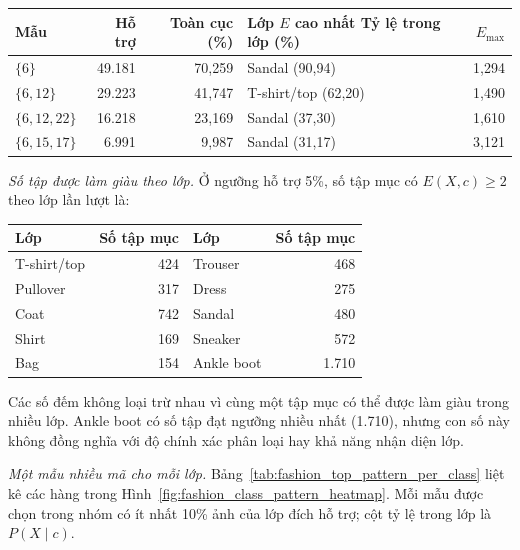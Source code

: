 \begin{center}
    \label{tab:fashion_representative_patterns}
    \scriptsize
    \setlength{\tabcolsep}{2pt}
    \begin{tabular}{@{}l r r l r@{}}
        \toprule
        Mẫu & Hỗ trợ & Toàn cục (\%) & \shortstack{Lớp $E$ cao nhất\\Tỷ lệ trong lớp (\%)} & $E_{\max}$ \\
        \midrule
        $\{6\}$ & 49.181 & 70,259 & Sandal (90,94) & 1,294 \\
        $\{6,12\}$ & 29.223 & 41,747 & T-shirt/top (62,20) & 1,490 \\
        $\{6,12,22\}$ & 16.218 & 23,169 & Sandal (37,30) & 1,610 \\
        $\{6,15,17\}$ & 6.991 & 9,987 & Sandal (31,17) & 3,121 \\
        \bottomrule
    \end{tabular}
\end{center}

\textit{Số tập được làm giàu theo lớp.}
Ở ngưỡng hỗ trợ 5\%, số tập mục có $E(X,c)\geq2$ theo lớp lần lượt là:

\begin{center}
    \label{tab:fashion_enriched_counts_by_class}
    \scriptsize
    \begin{tabular}{@{}l r@{\qquad}l r@{}}
        \toprule
        Lớp & Số tập mục & Lớp & Số tập mục \\
        \midrule
        T-shirt/top & 424 & Trouser & 468 \\
        Pullover & 317 & Dress & 275 \\
        Coat & 742 & Sandal & 480 \\
        Shirt & 169 & Sneaker & 572 \\
        Bag & 154 & Ankle boot & 1.710 \\
        \bottomrule
    \end{tabular}
\end{center}

Các số đếm không loại trừ nhau vì cùng một tập mục có thể được làm giàu trong nhiều lớp. Ankle boot có số tập đạt ngưỡng nhiều nhất (1.710), nhưng con số này không đồng nghĩa với độ chính xác phân loại hay khả năng nhận diện lớp.

\textit{Một mẫu nhiều mã cho mỗi lớp.}
Bảng~\ref{tab:fashion_top_pattern_per_class} liệt kê các hàng trong Hình~\ref{fig:fashion_class_pattern_heatmap}. Mỗi mẫu được chọn trong nhóm có ít nhất 10\% ảnh của lớp đích hỗ trợ; cột tỷ lệ trong lớp là $P(X\mid c)$.

